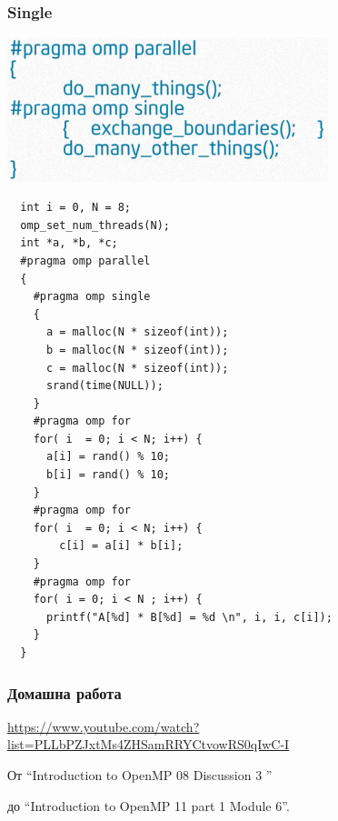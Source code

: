 \documentclass{beamer}
\begin{document}
\begin{frame}
  \frametitle{Single}
  \centering
  \includegraphics[width=0.7\textwidth]{single}
\end{frame}


\begin{frame}
\scriptsize
\lstset{language=C++}
\begin{lstlisting}
  int i = 0, N = 8;
  omp_set_num_threads(N);
  int *a, *b, *c;
  #pragma omp parallel
  {
    #pragma omp single
    {
      a = malloc(N * sizeof(int));
      b = malloc(N * sizeof(int));
      c = malloc(N * sizeof(int));
      srand(time(NULL));
    }
    #pragma omp for
    for( i  = 0; i < N; i++) {
      a[i] = rand() % 10;  
      b[i] = rand() % 10;
    }
    #pragma omp for
    for( i  = 0; i < N; i++) {
        c[i] = a[i] * b[i];
    }
    #pragma omp for
    for( i = 0; i < N ; i++) {
      printf("A[%d] * B[%d] = %d \n", i, i, c[i]);
    }
  }
\end{lstlisting}
\end{frame}


\begin{frame}
  \frametitle{Домашна работа}
\url{https://www.youtube.com/watch?list=PLLbPZJxtMs4ZHSamRRYCtvowRS0qIwC-I}  

От ``Introduction to OpenMP 08 Discussion 3 ''
 
до ``Introduction to OpenMP 11 part 1 Module 6''.

\end{frame}
\end{document}
